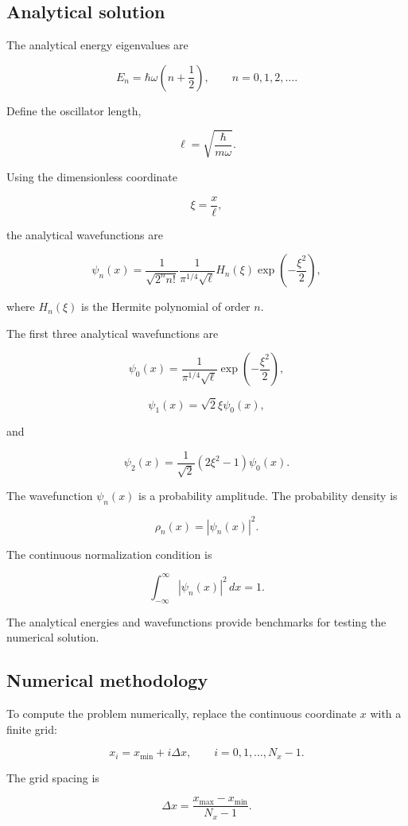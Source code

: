 \subsection{Analytical solution}

The analytical energy eigenvalues are

\[
E_n
=
\hbar\omega
\left(
n+\frac{1}{2}
\right),
\qquad
n=0,1,2,\ldots.
\]

Define the oscillator length,

\[
\ell
=
\sqrt{
\frac{\hbar}{m\omega}
}.
\]

Using the dimensionless coordinate

\[
\xi
=
\frac{x}{\ell},
\]

the analytical wavefunctions are

\[
\psi_n(x)
=
\frac{1}{
\sqrt{2^n n!}
}
\frac{1}{
\pi^{1/4}\sqrt{\ell}
}
H_n(\xi)
\exp\left(-\frac{\xi^2}{2}\right),
\]

where \(H_n(\xi)\) is the Hermite polynomial of order \(n\).

The first three analytical wavefunctions are

\[
\psi_0(x)
=
\frac{1}{\pi^{1/4}\sqrt{\ell}}
\exp\left(-\frac{\xi^2}{2}\right),
\]

\[
\psi_1(x)
=
\sqrt{2}\xi\psi_0(x),
\]

and

\[
\psi_2(x)
=
\frac{1}{\sqrt{2}}
\left(
2\xi^2-1
\right)
\psi_0(x).
\]

The wavefunction \(\psi_n(x)\) is a probability amplitude. The probability density is

\[
\rho_n(x)
=
|\psi_n(x)|^2.
\]

The continuous normalization condition is

\[
\int_{-\infty}^{\infty}
|\psi_n(x)|^2\,dx
=
1.
\]

The analytical energies and wavefunctions provide benchmarks for testing the numerical solution.

\subsection{Numerical methodology}

To compute the problem numerically, replace the continuous coordinate \(x\) with a finite grid:

\[
x_i
=
x_{\min}
+
i\Delta x,
\qquad
i=0,1,\ldots,N_x-1.
\]

The grid spacing is

\[
\Delta x
=
\frac{x_{\max}-x_{\min}}{N_x-1}.
\]

